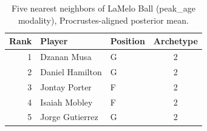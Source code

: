\begin{table}[htbp]
  \centering\small
  \begin{tabular}{rllc}
    \toprule
    Rank & Player & Position & Archetype \\
    \midrule
    1 & Dzanan Musa & G & 2 \\
    2 & Daniel Hamilton & G & 2 \\
    3 & Jontay Porter & F & 2 \\
    4 & Isaiah Mobley & F & 2 \\
    5 & Jorge Gutierrez & G & 2 \\
    \bottomrule
  \end{tabular}
  \caption{Five nearest neighbors of LaMelo Ball (peak_age modality), Procrustes-aligned posterior mean.}
  \label{tab:LaMelo_Ball_neighbors_peak_age}
\end{table}

